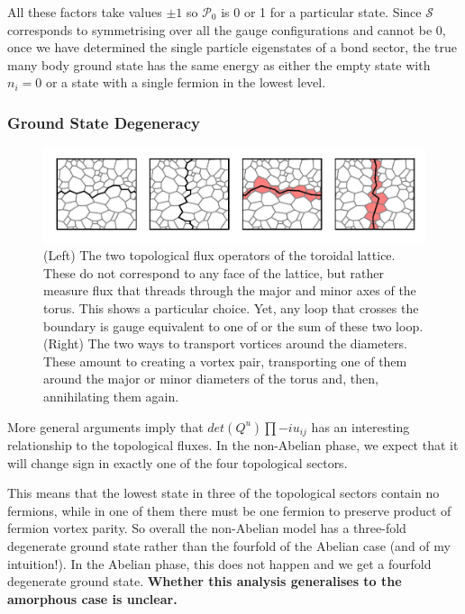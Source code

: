All these factors take values \(\pm 1\) so \(\mathcal{P}_0\) is 0 or 1 for a particular state. Since \(\mathcal{S}\) corresponds to symmetrising over all the gauge configurations and cannot be 0, once we have determined the single particle eigenstates of a bond sector, the true many body ground state has the same energy as either the empty state with \(n_i = 0\) or a state with a single fermion in the lowest level.

\hypertarget{ground-state-degeneracy}{%
\subsubsection{Ground State Degeneracy}\label{ground-state-degeneracy}}

\hypertarget{fig:loops_and_dual_loops}{%
\begin{figure}
\centering
\includegraphics[width=1\textwidth,height=\textheight]{figure_code/amk_chapter/loops_and_dual_loops/loops_and_dual_loops}
\caption[{Topological Loops and Dual Loops}]{(Left) The two topological flux operators of the toroidal lattice. These do not correspond to any face of the lattice, but rather measure flux that threads through the major and minor axes of the torus. This shows a particular choice. Yet, any loop that crosses the boundary is gauge equivalent to one of or the sum of these two loop. (Right) The two ways to transport vortices around the diameters. These amount to creating a vortex pair, transporting one of them around the major or minor diameters of the torus and, then, annihilating them again.}
\label{fig:loops_and_dual_loops}
\end{figure}
}

More general arguments \autocite{chungExplicitMonodromyMoore2007,oshikawaTopologicalDegeneracyNonAbelian2007} imply that \(det(Q^u) \prod -i u_{ij}\) has an interesting relationship to the topological fluxes. In the non-Abelian phase, we expect that it will change sign in exactly one of the four topological sectors.

This means that the lowest state in three of the topological sectors contain no fermions, while in one of them there must be one fermion to preserve product of fermion vortex parity. So overall the non-Abelian model has a three-fold degenerate ground state rather than the fourfold of the Abelian case (and of my intuition!). In the Abelian phase, this does not happen and we get a fourfold degenerate ground state. \textbf{Whether this analysis generalises to the amorphous case is unclear.}

